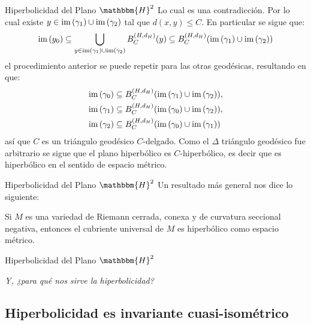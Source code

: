 \documentclass[xcolor=dvipsnames]{beamer}
\theoremstyle{largebreak}
\newcommand{\bbm}[1]{\ensuremath{\mathbbm{#1}}}
\newcommand{\im}[1]{\ensuremath{\textup{im}\left(#1\right)}}
\begin{document}
\begin{frame}{Hiperbolicidad del Plano $\bbm{H}^2$}
    Lo cual es una contradicción. Por lo cual existe $y\in\im{\gamma_1}\cup\im{\gamma_2}$ tal que $d(x,y)\leq C$. En particular se sigue que:
    \begin{equation*}
        \im{y_0}\subseteq \bigcup_{y\in\im{\gamma_1}\cup\im{\gamma_2}}B_C^{(H,d_H)}(y)\subseteq B_C^{(H,d_H)}( \im{\gamma_1}\cup\im{\gamma_2} )
    \end{equation*}
    el procedimiento anterior se puede repetir para las otras geodésicas, resultando en que:
    \begin{equation*}
        \begin{split}
            \im{\gamma_0}&\subseteq B_{C}^{(H,d_H)}(\im{\gamma_1}\cup\im{\gamma_2}),\\
            \im{\gamma_1}&\subseteq B_{C}^{(H,d_H)}(\im{\gamma_0}\cup\im{\gamma_2}),\\
            \im{\gamma_2}&\subseteq B_{C}^{(H,d_H)}(\im{\gamma_0}\cup\im{\gamma_1})\\
        \end{split}
    \end{equation*}
    así que $C$ es un triángulo geodésico $C$-delgado. Como el $\Delta$ triángulo geodésico fue arbitrario se sigue que el plano hiperbólico es $C$-hiperbólico, es decir que es hiperbólico en el sentido de espacio métrico.
\end{frame}

\begin{frame}{Hiperbolicidad del Plano $\bbm{H}^2$}
    Un resultado más general nos dice lo siguiente:
    \pause
    \begin{theor}
        Si $M$ es una variedad de Riemann cerrada, conexa y de curvatura seccional negativa, entonces el cubriente universal de $M$ es hiperbólico como espacio métrico.
    \end{theor}

\end{frame}

\begin{frame}{Hiperbolicidad del Plano $\bbm{H}^2$}
    \begin{center}
        \Large\textit{Y, ¿para qué nos sirve la hiperbolicidad?}
    \end{center}
\end{frame}

\subsection{Hiperbolicidad es invariante cuasi-isométrico}
\end{document}

